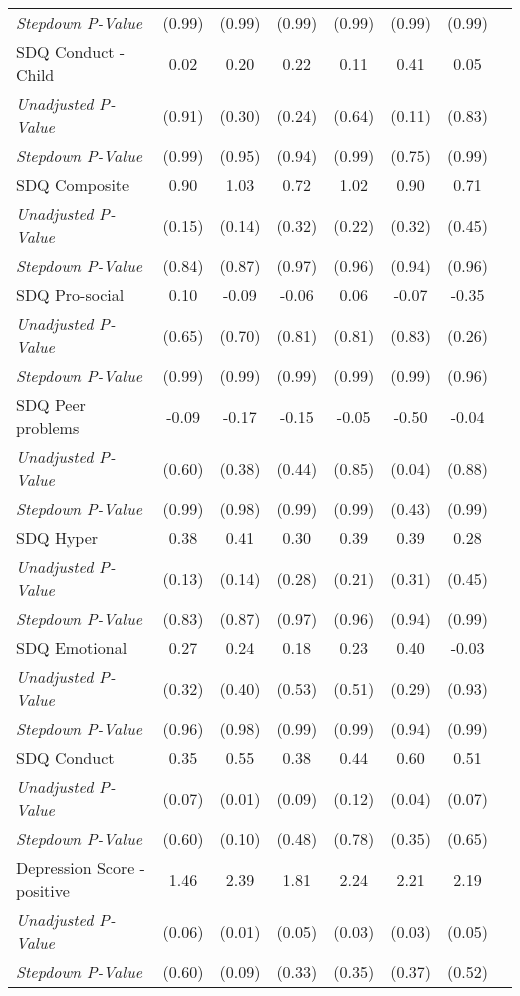 \begin{tabular}{l c c c c c c c}
\quad \textit{Stepdown P-Value} & (0.99) & (0.99) & (0.99) & (0.99) & (0.99) & (0.99) \\
SDQ Conduct - Child & 0.02 & 0.20 & 0.22 & 0.11 & 0.41 & 0.05 \\
\quad \textit{Unadjusted P-Value} & (0.91) & (0.30) & (0.24) & (0.64) & (0.11) & (0.83) \\
\quad \textit{Stepdown P-Value} & (0.99) & (0.95) & (0.94) & (0.99) & (0.75) & (0.99) \\
SDQ Composite & 0.90 & 1.03 & 0.72 & 1.02 & 0.90 & 0.71 \\
\quad \textit{Unadjusted P-Value} & (0.15) & (0.14) & (0.32) & (0.22) & (0.32) & (0.45) \\
\quad \textit{Stepdown P-Value} & (0.84) & (0.87) & (0.97) & (0.96) & (0.94) & (0.96) \\
SDQ Pro-social & 0.10 & -0.09 & -0.06 & 0.06 & -0.07 & -0.35 \\
\quad \textit{Unadjusted P-Value} & (0.65) & (0.70) & (0.81) & (0.81) & (0.83) & (0.26) \\
\quad \textit{Stepdown P-Value} & (0.99) & (0.99) & (0.99) & (0.99) & (0.99) & (0.96) \\
SDQ Peer problems & -0.09 & -0.17 & -0.15 & -0.05 & -0.50 & -0.04 \\
\quad \textit{Unadjusted P-Value} & (0.60) & (0.38) & (0.44) & (0.85) & (0.04) & (0.88) \\
\quad \textit{Stepdown P-Value} & (0.99) & (0.98) & (0.99) & (0.99) & (0.43) & (0.99) \\
SDQ Hyper & 0.38 & 0.41 & 0.30 & 0.39 & 0.39 & 0.28 \\
\quad \textit{Unadjusted P-Value} & (0.13) & (0.14) & (0.28) & (0.21) & (0.31) & (0.45) \\
\quad \textit{Stepdown P-Value} & (0.83) & (0.87) & (0.97) & (0.96) & (0.94) & (0.99) \\
SDQ Emotional & 0.27 & 0.24 & 0.18 & 0.23 & 0.40 & -0.03 \\
\quad \textit{Unadjusted P-Value} & (0.32) & (0.40) & (0.53) & (0.51) & (0.29) & (0.93) \\
\quad \textit{Stepdown P-Value} & (0.96) & (0.98) & (0.99) & (0.99) & (0.94) & (0.99) \\
SDQ Conduct & 0.35 & 0.55 & 0.38 & 0.44 & 0.60 & 0.51 \\
\quad \textit{Unadjusted P-Value} & (0.07) & (0.01) & (0.09) & (0.12) & (0.04) & (0.07) \\
\quad \textit{Stepdown P-Value} & (0.60) & (0.10) & (0.48) & (0.78) & (0.35) & (0.65) \\
Depression Score - positive & 1.46 & 2.39 & 1.81 & 2.24 & 2.21 & 2.19 \\
\quad \textit{Unadjusted P-Value} & (0.06) & (0.01) & (0.05) & (0.03) & (0.03) & (0.05) \\
\quad \textit{Stepdown P-Value} & (0.60) & (0.09) & (0.33) & (0.35) & (0.37) & (0.52) \\
\bottomrule
\end{tabular}
